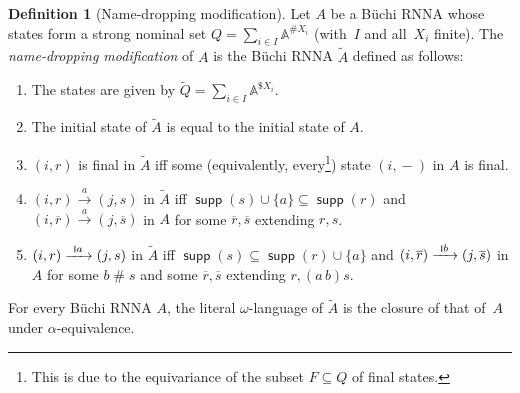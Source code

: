 \documentclass[10pt,a4paper]{amsart}
\newcommand{\scriptmidmid}{\hspace{0.2ex}{\rule[-0.1ex]{0.6pt}{1.1ex}}\hspace{0.2ex}}
\newcommand{\scriptnew}[1]{{\scriptmidmid}#1}
\numberwithin{equation}{section}
\newcommand{\ol}{\overline}
\newcommand{\xto}[1]{\xrightarrow{~#1~}}
\newcommand{\seq}{\subseteq}
\newcommand{\tl}{\widetilde}
\newcommand{\dash}{\mathop{-}}
\newcommand{\+}[1]{\mathcal{#1}\xspace}
\newcommand{\names}{\mathbb{A}}
\DeclareMathOperator{\supp}{\mathsf{supp}} %
\newcommand{\fresh}{\mathbin{\#}}
\theoremstyle{definition}
\newtheorem{defn}[theorem]{Definition}
\begin{document}
\begin{defn}[Name-dropping modification]\label{def:ndc}
  Let $A$ be a Büchi RNNA whose states form a strong nominal set
  $Q=\sum_{i\in I} \names^{\# X_i}$ (with~$I$ and all~$X_i$
  finite). The \emph{name-dropping modification} of $A$ is the Büchi RNNA
  $\widetilde{A}$ defined as follows:
  \begin{enumerate}
  \item The states are given by $\tl{Q} = \sum_{i\in I}\names^{\$ X_i}$.
  \item The initial state of $\tl{A}$ is equal to the initial state of $A$.
  \item $(i,r)$ is final in $\tl{A}$ iff some (equivalently,
    every\footnote{This is due to the equivariance of the subset $F
      \subseteq Q$ of final states.})
    state $(i,\dash)$ in $A$ is final.
    

  \item $(i,r)\xto{a} (j,s)$  in $\tl{A}$ iff $\supp(s)\cup \{a\}
    \seq \supp(r)$ and $(i,\ol{r})\xto{a} (j,\ol{s})$ in $A$ for some
    $\ol{r},\ol{s}$ extending $r, s$.
    
  \item $(i,r)\xto{\scriptnew a} (j,s)$ in $\tl{A}$ iff $\supp(s)\seq
    \supp(r)\cup \{a\}$ and $(i,\ol{r})\xto{\scriptnew b} (j,\ol{s})$ in $A$ for
    some $b\fresh s$ and some $\ol{r},\ol{s}$ extending $r,(a\,b)s$.
  \end{enumerate}
\end{defn}
%
\begin{theorem}\label{thm:ncd_buechi_rnna}
  For every Büchi RNNA $A$, the literal $\omega$-language
  of $\tl A$ is the closure of that of~$A$ under $\alpha$-equivalence.
\end{theorem}
%
\end{document}

